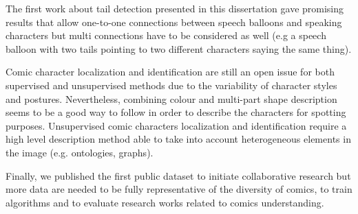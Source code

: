 The first work about tail detection presented in this dissertation gave promising results that allow one-to-one connections between speech balloons and speaking characters but multi connections have to be considered as well (e.g a speech balloon with two tails pointing to two different characters saying the same thing).

Comic character localization and identification are still an open issue for both supervised and unsupervised methods due to the variability of character styles and postures.
Nevertheless, combining colour and multi-part shape description seems to be a good way to follow in order to describe the characters for spotting purposes.
Unsupervised comic characters localization and identification require a high level description method able to take into account heterogeneous elements in the image (e.g. ontologies, graphs).

Finally, we published the first public dataset to initiate collaborative research but more data are needed to be fully representative of the diversity of comics, to train algorithms and to evaluate research works related to comics understanding.

